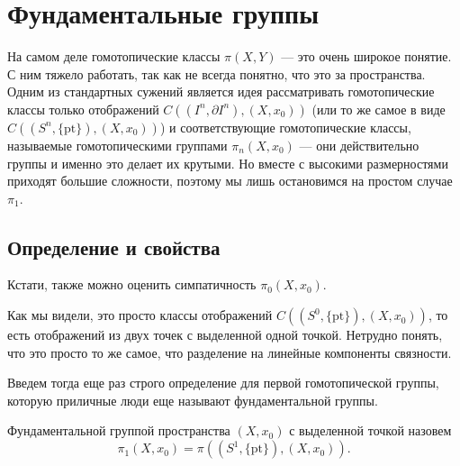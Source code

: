 \section{Фундаментальные группы}
\begin{Intro}
    На самом деле гомотопические классы $\pi(X,Y)$ --- это очень широкое понятие. С ним тяжело работать, так как не всегда понятно, что это за пространства. Одним из стандартных сужений является идея рассматривать гомотопические классы только отображений $C\left( (I^n, \partial I^n), (X, x_0)\right)$ (или то же самое в виде $C\left( (S^n, \{\mathrm{pt}\}), (X, x_0)\right)$) и соответствующие гомотопические классы, называемые  гомотопическими группами $\pi_n(X, x_0)$  --- они действительно группы  и именно это делает их крутыми. Но вместе с высокими размерностями приходят большие сложности, поэтому мы лишь остановимся на простом случае $\pi_1$.
\end{Intro}
\subsection{Определение и свойства}
\begin{Note}
    Кстати, также можно оценить симпатичность $\pi_0(X, x_0)$. 

    Как мы видели, это просто классы отображений $C((S^0, \{\mathrm{pt}\}), (X, x_0))$, то есть отображений из двух точек с выделенной одной точкой. Нетрудно понять, что это просто то же самое, что разделение на линейные компоненты связности.
\end{Note}

Введем тогда еще раз строго определение для первой гомотопической группы, которую приличные люди еще называют фундаментальной группы. 
\begin{Def}
   Фундаментальной группой пространства $(X, x_0)$ с выделенной точкой назовем 
   \[
       \pi_1(X, x_0) = \pi((S^1, \{\mathrm{pt}\}), (X, x_0)).
   \] 
\end{Def}

